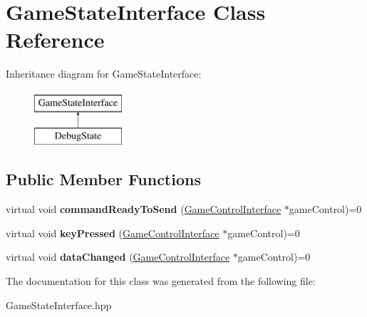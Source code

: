 \hypertarget{class_game_state_interface}{}\section{Game\+State\+Interface Class Reference}
\label{class_game_state_interface}
Inheritance diagram for Game\+State\+Interface\+:\begin{figure}[H]
\begin{center}
\leavevmode
\includegraphics[height=2.000000cm]{class_game_state_interface}
\end{center}
\end{figure}
\subsection*{Public Member Functions}
\begin{DoxyCompactItemize}
\item 
virtual void {\bfseries command\+Ready\+To\+Send} (\hyperlink{class_game_control_interface}{Game\+Control\+Interface} $\ast$game\+Control)=0\hypertarget{class_game_state_interface_a6fc898f57eb2a8abb221c37fb865655e}{}\label{class_game_state_interface_a6fc898f57eb2a8abb221c37fb865655e}

\item 
virtual void {\bfseries key\+Pressed} (\hyperlink{class_game_control_interface}{Game\+Control\+Interface} $\ast$game\+Control)=0\hypertarget{class_game_state_interface_aa78a52cdc1671836db67eb403fd8de5b}{}\label{class_game_state_interface_aa78a52cdc1671836db67eb403fd8de5b}

\item 
virtual void {\bfseries data\+Changed} (\hyperlink{class_game_control_interface}{Game\+Control\+Interface} $\ast$game\+Control)=0\hypertarget{class_game_state_interface_a1c392f30c3b984180ab45f8ae5ecea80}{}\label{class_game_state_interface_a1c392f30c3b984180ab45f8ae5ecea80}

\end{DoxyCompactItemize}


The documentation for this class was generated from the following file\+:\begin{DoxyCompactItemize}
\item 
Game\+State\+Interface.\+hpp\end{DoxyCompactItemize}
